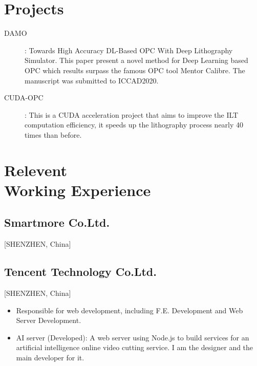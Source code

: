 \documentclass{mycv}
\begin{document}
\section{Projects}

\begin{description}
  \item[DAMO]: Towards High Accuracy DL-Based OPC With Deep Lithography Simulator. This paper present a novel method for Deep Learning based OPC which results surpass the famous OPC tool Mentor Calibre. The manuscript was submitted to ICCAD2020.
  \item[CUDA-OPC]: This is a CUDA acceleration project that aims to improve the ILT computation efficiency, it speeds up the lithography process nearly 40 times than before.
\end{description}

\section{Relevent \\ Working Experience}

\subsection{Smartmore Co.Ltd.}[SHENZHEN, China]
\begin{positions}
\end{positions}



\subsection{Tencent Technology Co.Ltd.}[SHENZHEN, China]
\begin{positions}
\end{positions}

\begin{itemize}
  \item Responsible for web development, including F.E. Development and Web Server Development.
  \item AI server (Developed): A web server using Node.js to build services for an artificial intelligence online video cutting service. I am the designer and the main developer for it.
\end{itemize}
\end{document}
